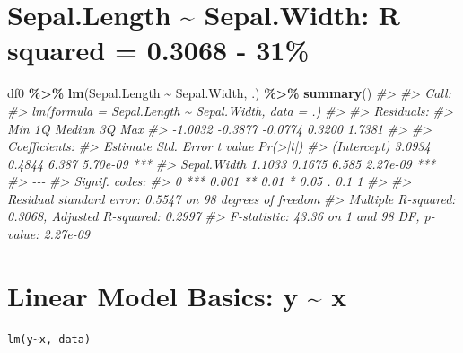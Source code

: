 \documentclass[
  xelatex, ja=standard]{bxjsbook}
\newenvironment{Shaded}{\begin{snugshade}}{\end{snugshade}}
\newcommand{\CommentTok}[1]{\textcolor[rgb]{0.56,0.35,0.01}{\textit{#1}}}
\newcommand{\FunctionTok}[1]{\textcolor[rgb]{0.13,0.29,0.53}{\textbf{#1}}}
\newcommand{\NormalTok}[1]{#1}
\newcommand{\SpecialCharTok}[1]{\textcolor[rgb]{0.81,0.36,0.00}{\textbf{#1}}}
\theoremstyle{definition}
\theoremstyle{definition}
\theoremstyle{definition}
\theoremstyle{definition}
\theoremstyle{remark}
\begin{document}
\hypertarget{sepal.length-sepal.width-r-squared-0.3068---31}{%
\section{Sepal.Length \textasciitilde{} Sepal.Width: R squared = 0.3068 - 31\%}\label{sepal.length-sepal.width-r-squared-0.3068---31}}

\begin{Shaded}
\begin{Highlighting}[]
\NormalTok{df0 }\SpecialCharTok{\%\textgreater{}\%} \FunctionTok{lm}\NormalTok{(Sepal.Length }\SpecialCharTok{\textasciitilde{}}\NormalTok{ Sepal.Width, .) }\SpecialCharTok{\%\textgreater{}\%} \FunctionTok{summary}\NormalTok{()}
\CommentTok{\#\textgreater{} }
\CommentTok{\#\textgreater{} Call:}
\CommentTok{\#\textgreater{} lm(formula = Sepal.Length \textasciitilde{} Sepal.Width, data = .)}
\CommentTok{\#\textgreater{} }
\CommentTok{\#\textgreater{} Residuals:}
\CommentTok{\#\textgreater{}     Min      1Q  Median      3Q     Max }
\CommentTok{\#\textgreater{} {-}1.0032 {-}0.3877 {-}0.0774  0.3200  1.7381 }
\CommentTok{\#\textgreater{} }
\CommentTok{\#\textgreater{} Coefficients:}
\CommentTok{\#\textgreater{}             Estimate Std. Error t value Pr(\textgreater{}|t|)    }
\CommentTok{\#\textgreater{} (Intercept)   3.0934     0.4844   6.387 5.70e{-}09 ***}
\CommentTok{\#\textgreater{} Sepal.Width   1.1033     0.1675   6.585 2.27e{-}09 ***}
\CommentTok{\#\textgreater{} {-}{-}{-}}
\CommentTok{\#\textgreater{} Signif. codes:  }
\CommentTok{\#\textgreater{} 0 \textquotesingle{}***\textquotesingle{} 0.001 \textquotesingle{}**\textquotesingle{} 0.01 \textquotesingle{}*\textquotesingle{} 0.05 \textquotesingle{}.\textquotesingle{} 0.1 \textquotesingle{} \textquotesingle{} 1}
\CommentTok{\#\textgreater{} }
\CommentTok{\#\textgreater{} Residual standard error: 0.5547 on 98 degrees of freedom}
\CommentTok{\#\textgreater{} Multiple R{-}squared:  0.3068, Adjusted R{-}squared:  0.2997 }
\CommentTok{\#\textgreater{} F{-}statistic: 43.36 on 1 and 98 DF,  p{-}value: 2.27e{-}09}
\end{Highlighting}
\end{Shaded}

\hypertarget{linear-model-basics-y-x}{%
\section{Linear Model Basics: y \textasciitilde{} x}\label{linear-model-basics-y-x}}

\begin{verbatim}
lm(y~x, data)
\end{verbatim}
\end{document}
